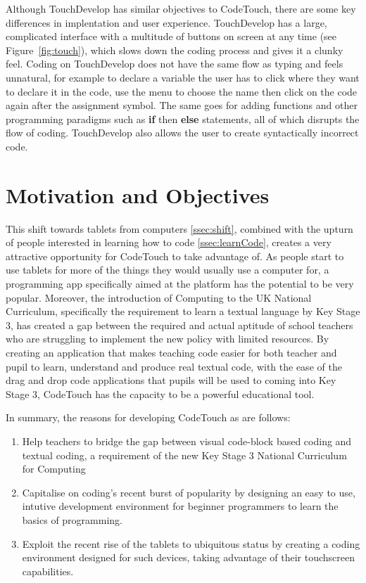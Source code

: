 \documentclass[ %
                    author={Jonathan Rankin},
                supervisor={Dr. David May, Dr. Ian Holyer},
                    degree={MEng},
                     title={CodeTouch},
                  subtitle={A Revolutionary Way To Program Real Code On Touch Screen Devices},
                      type={enterprise},
                      year={2015 } ]{dissertation}
\begin{document}
Although TouchDevelop has similar objectives to CodeTouch, there are some key differences in implentation and user experience. TouchDevelop has a large, complicated interface with a multitude of buttons on screen at any time (see Figure~\ref{fig:touch}), which slows down the coding process and gives it a clunky feel. Coding on TouchDevelop does not have the same flow as typing and feels unnatural, for example to declare a variable the user has to click where they want to declare it in the code, use the menu to choose the name then click on the code again after the assignment symbol. The same goes for adding functions and other programming paradigms such as \textbf{if} then \textbf{else} statements, all of which disrupts the flow of coding. TouchDevelop also allows the user to create syntactically incorrect code. 





\section {Motivation and Objectives}
This shift towards tablets from computers \ref{ssec:shift}, combined with the upturn of people interested in learning how to code \ref{ssec:learnCode}, creates a very attractive opportunity for CodeTouch to take advantage of. As people start to use tablets for more of the things they would usually use a computer for, a programming app specifically aimed at the platform has the potential to be very popular. Moreover, the introduction of Computing to the UK National Curriculum, specifically the requirement to learn a textual language by Key Stage 3, has created a gap between the required and actual aptitude of school teachers who are struggling to implement the new policy with limited resources. By creating an application that makes teaching code easier for both teacher and pupil to learn, understand and produce real textual code, with the ease of the drag and drop code applications that pupils will be used to coming into Key Stage 3, CodeTouch has the capacity to be a powerful educational tool. 




In summary, the reasons for developing CodeTouch as are follows:

\begin{enumerate}
\item Help teachers to bridge the gap between visual code-block based coding and textual coding, a requirement of the new Key Stage 3 National Curriculum for Computing
\item Capitalise on coding's recent burst of popularity by designing an easy to use, intutive development environment for beginner programmers to learn the basics of programming.
\item Exploit the recent rise of the tablets to ubiquitous status by creating a coding environment designed for such devices, taking advantage of their touchscreen capabilities. 
\end{enumerate}
\end{document}
